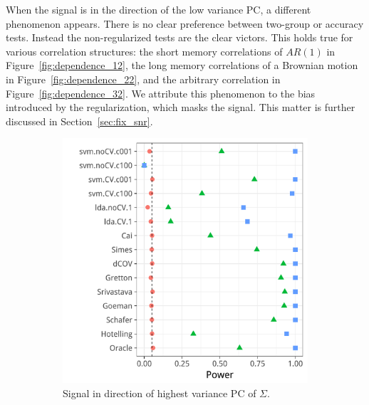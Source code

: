 \documentclass[journal]{IEEEtran}
\begin{document}
When the signal is in the direction of the low variance PC, a different phenomenon appears.
There is no clear preference between two-group or accuracy tests.
Instead the non-regularized tests are the clear victors. 
This holds true for various correlation structures: the short memory correlations of $AR(1)$ in Figure~\ref{fig:dependence_12}, the long memory correlations of a Brownian motion in Figure~\ref{fig:dependence_22}, and the arbitrary correlation in Figure~\ref{fig:dependence_32}.
We attribute this phenomenon to the bias introduced by the regularization, which masks the signal.
This matter is further discussed in Section~\ref{sec:fix_snr}.

\begin{figure}[h]
	\centering
	\caption{Short memory, AR(1) correlation. 
		$\Sigma_{k,l}=\rho^{|k-l|}; \rho=0.6$}	
	\label{fig:dependence_1}
	\begin{subfigure}[t]{.45\columnwidth}
		\centering
		\includegraphics[width=1\columnwidth]{"art/file20"}
		\caption{Signal in direction of highest variance PC of $\Sigma$.} 
		\label{fig:dependence_11}
	\end{subfigure}
	\begin{subfigure}[t]{.45\columnwidth}
		\centering

\end{subfigure}
\end{figure}
\end{document}
